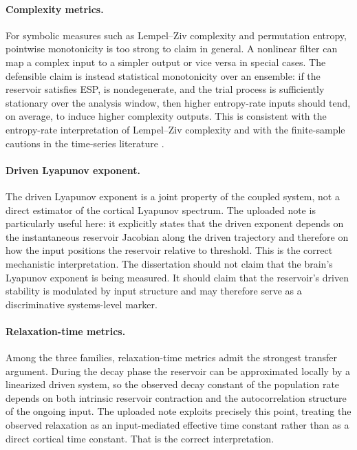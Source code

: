 \paragraph{Complexity metrics.}
For symbolic measures such as Lempel--Ziv complexity and permutation entropy, pointwise monotonicity is too strong to claim in general. A nonlinear filter can map a complex input to a simpler output or vice versa in special cases. The defensible claim is instead statistical monotonicity over an ensemble: if the reservoir satisfies ESP, is nondegenerate, and the trial process is sufficiently stationary over the analysis window, then higher entropy-rate inputs should tend, on average, to induce higher complexity outputs. This is consistent with the entropy-rate interpretation of Lempel--Ziv complexity and with the finite-sample cautions in the time-series literature \cite{bandt_permutation_2002,zunino_permutation_2017,little_permutation_2016}.

\paragraph{Driven Lyapunov exponent.}
The driven Lyapunov exponent is a joint property of the coupled system, not a direct estimator of the cortical Lyapunov spectrum. The uploaded note is particularly useful here: it explicitly states that the driven exponent depends on the instantaneous reservoir Jacobian along the driven trajectory and therefore on how the input positions the reservoir relative to threshold. This is the correct mechanistic interpretation. The dissertation should not claim that the brain's Lyapunov exponent is being measured. It should claim that the reservoir's driven stability is modulated by input structure and may therefore serve as a discriminative systems-level marker.

\paragraph{Relaxation-time metrics.}
Among the three families, relaxation-time metrics admit the strongest transfer argument. During the decay phase the reservoir can be approximated locally by a linearized driven system, so the observed decay constant of the population rate depends on both intrinsic reservoir contraction and the autocorrelation structure of the ongoing input. The uploaded note exploits precisely this point, treating the observed relaxation as an input-mediated effective time constant rather than as a direct cortical time constant. That is the correct interpretation.

